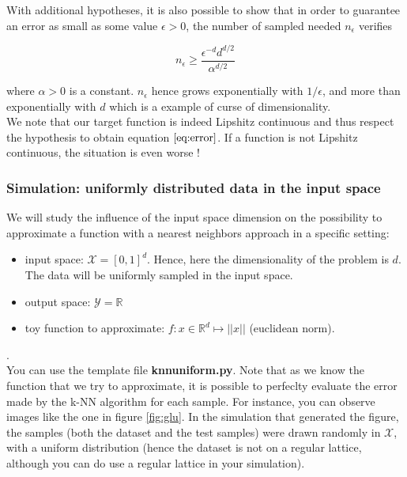 \documentclass[
10pt, %
a4paper, %
oneside, %
headinclude,footinclude, %
BCOR5mm, %
]{scrartcl}
\begin{document}
With additional hypotheses, it is also possible to show that in order to guarantee an error as small as some value $\epsilon>0$, 
the number of sampled needed  $n_{\epsilon}$ verifies

\begin{equation}
\label{eq:error}
    n_{\epsilon} \geq \frac{\epsilon^{-d}d^{d/2}}{\alpha^{d/2}} 
\end{equation}

where $\alpha > 0$ is a constant. $n_{\epsilon}$ hence grows exponentially with
$1/\epsilon$, and more than exponentially with $d$ which is a example of curse of dimensionality.
\\

We note that our target function is indeed Lipshitz continuous and thus respect the hypothesis to obtain equation $\ref{eq:error}$. If a function is not Lipshitz continuous, the situation is even worse !

\subsubsection{Simulation: uniformly distributed data in the input space}

We will study the influence of the input space dimension on the possibility to
approximate a function with a nearest neighbors approach in a specific setting:

\begin{itemize}
	\item input space: $ \mathcal{X} = [0, 1]^d$. Hence, here the
        dimensionality of the problem is $d$. The data will be uniformly
        sampled in the input space.
	\item output space: $\mathcal{Y} = \mathbb{R}$
	\item toy function to approximate: $f: x\in \mathbb{R}^d\mapsto ||x||$ (euclidean norm).
\end{itemize}

{\color{Purple}{Run a simulation that computes the test error of a kNN
estimator, for different values of $n$ and $d$, in order to observe the curse
of dimensionality. The dataset should be uniformly sampled in the input space.
You can experiment with the number of neighbors used of $k$, for instance $2$}}.
\\

You can use the template file \textbf{knn\textunderscore uniform.py}. Note that as we know the function that we try to approximate, it is possible to perfeclty evaluate the error made by the k-NN algorithm for each sample.
For instance, you can observe images like the one in figure 
\ref{fig:glu}. In the simulation that generated the figure, the samples (both
the dataset and the test samples) were
drawn randomly in $ \mathcal{X}$, with a uniform distribution (hence the dataset is
not on a regular lattice, although you can do use a regular lattice in your
simulation).
\end{document}
